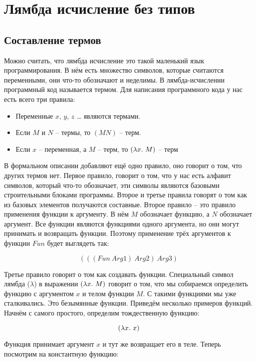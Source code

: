 \section{Лямбда исчисление без типов}

\subsection{Составление термов}

Можно считать, что лямбда исчисление это такой маленький язык
программирования. В нём есть множество символов, которые считаются
переменными, они что-то обозначают и неделимы. В лямбда-исчислении
программный код называется термом. Для написания программного кода у нас
есть всего три правила:

\begin{itemize}
\item
  Переменные $x$, $y$, $z$ \ldots{} являются термами.
\item
  Если $M$ и $N$ -- термы, то $(MN)$ -- терм.
\item
  Если $x$ -- переменная, а $M$ -- терм, то $(\lambda x .\  M)$ -- терм
\end{itemize}

В формальном описании добавляют ещё одно правило, оно говорит о том, что
других термов нет. Первое правило, говорит о том, что у нас есть алфавит
символов, который что-то обозначает, эти символы являются базовыми
строительными блоками программы. Второе и третье правила говорят о том
как из базовых элементов получаются составные. Второе правило -- это
правило применения функции к аргументу. В нём $M$ обозначает функцию, а
$N$ обозначает аргумент. Все функции являются функциями одного
аргумента, но они могут принимать и возвращать функции. Поэтому
применение трёх аргументов к функции $Fun$ будет выглядеть так:

\[(((Fun\ Arg1)\ Arg2)\ Arg3)\]

Третье правило говорит о том как создавать функции. Специальный символ
лямбда ($\lambda$) в выражении $(\lambda x .\  M)$ говорит о том, что мы
собираемся определить функцию с аргументом $x$ и телом функции $M$. С
такими функциями мы уже сталкивались. Это безымянные функции. Приведём
несколько примеров функций. Начнём с самого простого, определим
тождественную функцию:

\[(\lambda x .\  x)\]

Функция принимает аргумент $x$ и тут же возвращает его в теле. Теперь
посмотрим на константную функцию:

